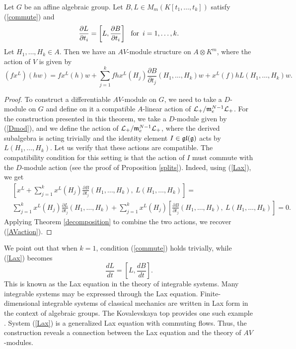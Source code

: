 \documentclass[12pt]{amsart}
\begin{document}
\begin{theorem}
Let $G$ be an affine algebraic group.
Let $B, L \in M_m(K[t_1,\ldots, t_k])$ satisfy (\ref{commute}) and
\begin{equation}
\label{Lax}
\frac{\partial L}{\partial t_i} = \left[ L,   \frac{\partial B}{\partial t_i} \right]
\ \ \text{for \,} i=1,\ldots,k.
\end{equation}
Let $H_1, \ldots, H_k \in A$. Then we have an $AV$-module structure on $A \otimes K^m$, where the action of $V$ is given by
\begin{equation}
\label{AVaction}
(f x^L)(hw) = f x^L(h) w + \sum_{j=1}^k fh x^L(H_j) \frac{\partial B}{\partial t_j} (H_1, \ldots, H_k) w + x^L(f) h L(H_1, \ldots, H_k) w.
\end{equation}
\end{theorem}
\begin{proof}
To construct a differentiable $AV$-module on $G$, we need to take a $D$-module on $G$ and define on it a compatible $A$-linear action of ${\mathcal L}_+ / \mathfrak{m}_e^{N-1} {\mathcal L}_+$.
For the construction presented in this theorem, we take a $D$-module given by (\ref{Dmod}), and we define the action of ${\mathcal L}_+ / \mathfrak{m}_e^{N-1} {\mathcal L}_+$, where the derived subalgebra is acting trivially and the identity element $I \in \mathfrak{gl}(\mathfrak{g})$ acts by 
$L(H_1, \ldots, H_k)$. Let us verify that these actions are compatible. The compatibility condition for this setting is that the action of $I$ must commute with the $D$-module action (see the proof of Proposition \ref{splits}). Indeed, using (\ref{Lax}), we get
\begin{align*}
&\left[ x^L + \sum_{j=1}^k x^L(H_j) \frac{\partial B}{\partial t_j} (H_1, \ldots, H_k), 
\ L(H_1, \ldots, H_k) \right] = \\
&\sum_{j=1}^k x^L(H_j) \frac{\partial L}{\partial t_j} (H_1, \ldots, H_k)
+ \sum_{j=1}^k x^L(H_j) \left[ \frac{\partial B}{\partial t_j} (H_1, \ldots, H_k), 
\ L(H_1, \ldots, H_k) \right] = 0.
\end{align*}
Applying Theorem \ref{decomposition} to combine the two actions, we recover 
(\ref{AVaction}).
\end{proof}

We point out that when $k=1$, condition (\ref{commute}) holds trivially, while (\ref{Lax}) becomes
$$\frac{dL}{dt} = \left[ L,   \frac{dB}{dt} \right].$$
This is known as the Lax equation in the theory of integrable systems. Many integrable systems may be expressed through the Lax equation. Finite-dimensional integrable systems of classical mechanics are written in Lax form in the context of algebraic groups. The Kovalevskaya top provides one such example \cite{Ts}.
System (\ref{Lax}) is a generalized Lax equation with commuting flows.
Thus, the construction reveals a connection between the Lax equation and the theory of $AV$-modules.
\end{document}
